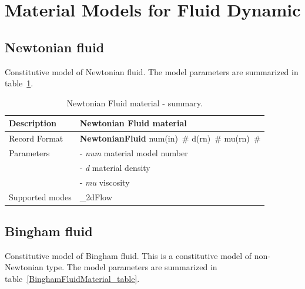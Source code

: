 \documentclass[a4paper]{article}
\newcommand{\descitem}[1]{{\noindent \bf #1}}
\newcommand{\elemparam}[2]{{{#1\tiny (#2)}~\#}}
\newcommand{\param}[1]{{\it #1}}
\begin{document}
\clearpage

\section{Material Models for Fluid Dynamic}
\subsection{Newtonian fluid}
\label{NewtonianFluidMaterial}
Constitutive model of Newtonian fluid. The model parameters are summarized
in table~\ref{NewtonianFluidMaterial_table}.

\begin{table}[!htb]
\begin{tabular}{|l|p{9cm}|}
\hline
Description & Newtonian Fluid material\\
\hline
Record Format & \descitem{NewtonianFluid} \elemparam{num}{in}
\elemparam{d}{rn} \elemparam{mu}{rn}\\
Parameters &- \param{num} material model number\\
&- \param{d} material density\\
&- \param{mu} viscosity\\
Supported modes& \_2dFlow\\
\hline
\end{tabular}
\caption{Newtonian Fluid material - summary.}
\label{NewtonianFluidMaterial_table}
\end{table}



\subsection{Bingham fluid}
\label{BinghamFluidMaterial}
Constitutive model of Bingham fluid. This is a constitutive model of
non-Newtonian type. The model parameters are summarized
in table~\ref{BinghamFluidMaterial_table}.
\end{document}
